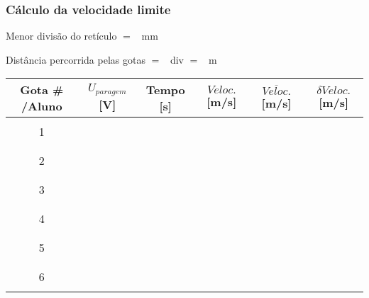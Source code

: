\documentclass[a4paper,12pt]{article}  %
\begin{document}
\subsubsection{\sf Cálculo da velocidade limite}
\label{sec:vlim}
\noindent Menor divisão do retículo  $=$~\underline{\makebox[2cm][r]{~}} mm

\noindent  Distância percorrida pelas gotas $=$~\underline{\makebox[1cm][r]{~}} div $=$~\underline{\makebox[2cm][r]{~}} m

\begin{center}
	\begin{tabular}{|c|c|c|c|c|c|}
	\hline
	Gota \# /Aluno   & $U_{paragem}$ [V] & Tempo [s] & $Veloc.$  [m/s]& $\overline{Veloc.}$ [m/s]	& $\delta Veloc.$ [m/s]  \\
	\hline
	  &  &  & &  & \\ \cline{2-4}
	1 &  & & &  & \\ \cline{2-4}
	  &  &  & &  & \\  \hline
	  &  &  & &  & \\ \cline{2-4}
	2 &  & & &  & \\ \cline{2-4}
	  &  &  & &  & \\ \hline
	  &  &  & &  & \\ \cline{2-4}
	3 &  & & &  & \\ \cline{2-4}
	  &  &  & &  & \\ \hline
	  &  &  & &  & \\ \cline{2-4}
	4 &  & & &  & \\ \cline{2-4}
	  &  &  & &  & \\ \hline
	  &  &  & &  & \\ \cline{2-4}
	5 &  & & &  & \\ \cline{2-4}
	  &  &  & &  & \\ \hline
	  &  &  & &  & \\ \cline{2-4}
	6 &  & & &  & \\ \cline{2-4}
	  &  &  & &  & \\ \hline
 	\end{tabular}
\end{center}

\end{document}
